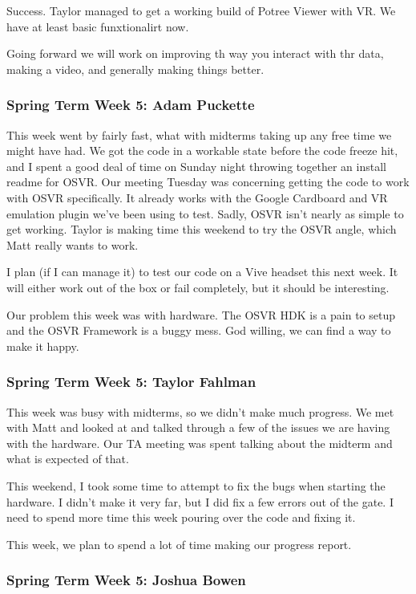 \documentclass[draftclsnofoot,onecolumn]{IEEEtran}
\begin{document}
Success. Taylor managed to get a working build of Potree Viewer with VR. We have at least basic funxtionalirt now.

Going forward we will work on improving th way you interact with thr data, making a video, and generally making things better.

\subsubsection{Spring Term Week 5: Adam Puckette}

This week went by fairly fast, what with midterms taking up any free time we might have had. We got the code in a workable state before the code freeze hit, and I spent a good deal of time on Sunday night throwing together an install readme for OSVR. Our meeting Tuesday was concerning getting the code to work with OSVR specifically. It already works with the Google Cardboard and VR emulation plugin we've been using to test. Sadly, OSVR isn't nearly as simple to get working. Taylor is making time this weekend to try the OSVR angle, which Matt really wants to work.

I plan (if I can manage it) to test our code on a Vive headset this next week. It will either work out of the box or fail completely, but it should be interesting.

Our problem this week was with hardware. The OSVR HDK is a pain to setup and the OSVR Framework is a buggy mess. God willing, we can find a way to make it happy.

\subsubsection{Spring Term Week 5: Taylor Fahlman}

This week was busy with midterms, so we didn’t make much progress. We met with Matt and looked at and talked through a few of the issues we are having with the hardware. Our TA meeting was spent talking about the midterm and what is expected of that.

This weekend, I took some time to attempt to fix the bugs when starting the hardware. I didn’t make it very far, but I did fix a few errors out of the gate. I need to spend more time this week pouring over the code and fixing it.

This week, we plan to spend a lot of time making our progress report.

\subsubsection{Spring Term Week 5: Joshua Bowen}
\end{document}
